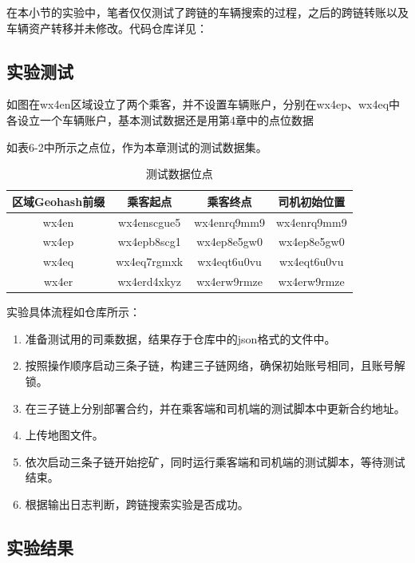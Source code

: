 在本小节的实验中，笔者仅仅测试了跨链的车辆搜索的过程，之后的跨链转账以及车辆资产转移并未修改。代码仓库详见：

\subsection{实验测试}

如图在wx4en区域设立了两个乘客，并不设置车辆账户，分别在wx4ep、wx4eq中各设立一个车辆账户，基本测试数据还是用第4章中的点位数据

如表6-2中所示之点位，作为本章测试的测试数据集。

\begin{table}[htbp]
    \linespread{1.5}
    \centering
    \caption{测试数据位点}\label{测试数据位点}
    \begin{tabular}{c|c|c|c} \toprule
        区域Geohash前缀 & 乘客起点        & 乘客终点        & 司机初始位置      \\\hline
        wx4en       & wx4enscgue5 & wx4enrq9mm9 & wx4enrq9mm9 \\
        wx4ep       & wx4epb8scg1 & wx4ep8e5gw0 & wx4ep8e5gw0 \\
        wx4eq       & wx4eq7rgmxk & wx4eqt6u0vu & wx4eqt6u0vu \\
        wx4er       & wx4erd4xkyz & wx4erw9rmze & wx4erw9rmze \\
        \bottomrule
    \end{tabular}
\end{table}

实验具体流程如仓库所示：

\begin{enumerate}
    \item 准备测试用的司乘数据，结果存于仓库中的json格式的文件中。
    \item 按照操作顺序启动三条子链，构建三子链网络，确保初始账号相同，且账号解锁。
    \item 在三子链上分别部署合约，并在乘客端和司机端的测试脚本中更新合约地址。
    \item 上传地图文件。
    \item 依次启动三条子链开始挖矿，同时运行乘客端和司机端的测试脚本，等待测试结束。
    \item 根据输出日志判断，跨链搜索实验是否成功。
\end{enumerate}

\subsection{实验结果}

